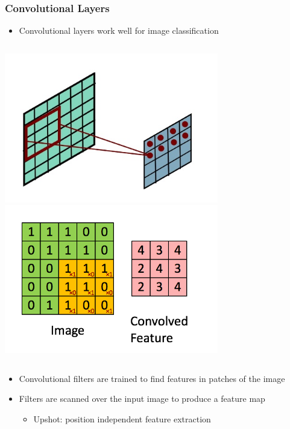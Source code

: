 \documentclass[10pt,professionalfonts,xcolor=table]{beamer}
\begin{document}
\begin{frame}
\frametitle{Convolutional Layers}


  \begin{itemize}
  \item Convolutional layers work well for image classification
  \end{itemize}
  \begin{columns}[c]
  \centering \includegraphics[width=0.7\textwidth]{figures/figures/conv3d.png}
  \centering \includegraphics[width=0.7\textwidth]{figures/figures/conv.png}
  \end{columns}
  \begin{itemize}
  \gap
  \item Convolutional filters are trained to find features in patches of the image
  \gap
  \item Filters are scanned over the input image to produce a feature map
    \begin{itemize}
    \item Upshot: position independent feature extraction
    \end{itemize}
  \gap
  \end{itemize}

\end{frame}
\end{document}
